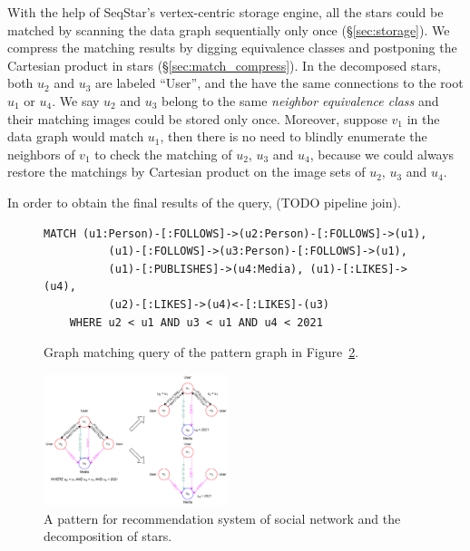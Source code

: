 With the help of SeqStar's vertex-centric storage engine,
all the stars could be matched by scanning the data graph sequentially only once (\S\ref{sec:storage}).
We compress the matching results by digging equivalence classes and postponing the Cartesian product in stars (\S\ref{sec:match_compress}).
In the decomposed stars, both $u_2$ and $u_3$ are labeled ``User'', and the have the same connections to the root $u_1$ or $u_4$.
We say $u_2$ and $u_3$ belong to the same \emph{neighbor equivalence class} and their matching images could be stored only once.
Moreover, suppose $v_1$ in the data graph would match $u_1$, then there is no need to blindly enumerate the neighbors of $v_1$ to check the matching of $u_2$, $u_3$ and $u_4$,
because we could always restore the matchings by Cartesian product on the image sets of $u_2$, $u_3$ and $u_4$.

In order to obtain the final results of the query, (TODO pipeline join).
\begin{figure}[ht]
  \begin{Verbatim}[fontsize=\small]
    MATCH (u1:Person)-[:FOLLOWS]->(u2:Person)-[:FOLLOWS]->(u1),
          (u1)-[:FOLLOWS]->(u3:Person)-[:FOLLOWS]->(u1),
          (u1)-[:PUBLISHES]->(u4:Media), (u1)-[:LIKES]->(u4),
          (u2)-[:LIKES]->(u4)<-[:LIKES]-(u3)
    WHERE u2 < u1 AND u3 < u1 AND u4 < 2021
  \end{Verbatim}
  \caption{Graph matching query of the pattern graph in Figure~\ref{img:pattern_graph}.}\label{img:cypher_query}
\end{figure}
\begin{figure}[ht]
  \centering
  \includegraphics[width=0.48\textwidth]{img/pattern_graph.pdf}
  \caption{A pattern for recommendation system of social network and the decomposition of stars.}\label{img:pattern_graph}
\end{figure}

